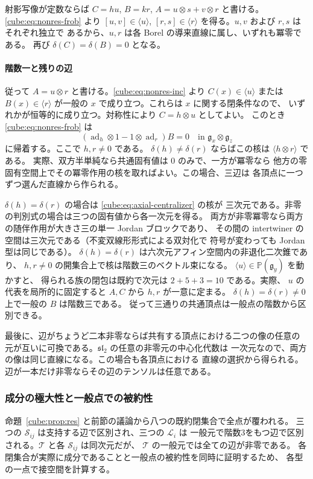 射影写像が定数ならば $C=hu$, $B=kr$, $A=u\otimes s+v\otimes r$ と書ける。
\eqref{cube:eq:nonres-frob} より $[u,v]\in\langle u\rangle$,
$[r,s]\in\langle r\rangle$ を得る。$u,v$ および $r,s$ はそれぞれ独立で
あるから、$u,r$ は各 Borel の導来直線に属し、いずれも冪零である。
再び $\delta(C)=\delta(B)=0$ となる。

\paragraph{階数一と残りの辺}
従って $A=u\otimes r$ と書ける。\eqref{cube:eq:nonres-inc} より
$C(x)\in\langle u\rangle$ または $B(x)\in\langle r\rangle$
が一般の $x$ で成り立つ。これらは $x$ に関する閉条件なので、
いずれかが恒等的に成り立つ。対称性により $C=h\otimes u$ としてよい。
このとき \eqref{cube:eq:nonres-frob} は
\begin{equation}\label{cube:eq:axial-centralizer}
 (\operatorname{ad}_h\otimes1-1\otimes\operatorname{ad}_r)B=0
 \quad\text{in }\mathfrak g_x\otimes\mathfrak g_z
\end{equation}
に帰着する。ここで $h,r\ne0$ である。
$\delta(h)\ne\delta(r)$ ならばこの核は $\langle h\otimes r\rangle$ である。
実際、双方半単純なら共通固有値は $0$ のみで、一方が冪零なら
他方の零固有空間上でその冪零作用の核を取ればよい。この場合、三辺は
各頂点に一つずつ選んだ直線から作られる。

$\delta(h)=\delta(r)$ の場合は \eqref{cube:eq:axial-centralizer} の核が
三次元である。非零の判別式の場合は三つの固有値から各一次元を得る。
両方が非零冪零なら両方の随伴作用が大きさ三の単一 Jordan ブロックであり、
その間の intertwiner の空間は三次元である（不変双線形形式による双対化で
符号が変わっても Jordan 型は同じである）。
$\delta(h)=\delta(r)$ は六次元アフィン空間内の非退化二次錐であり、
$h,r\ne0$ の開集合上で核は階数三のベクトル束になる。
$\langle u\rangle\in\mathbb P(\mathfrak g_y)$ を動かすと、
得られる族の閉包は既約で次元は $2+5+3=10$ である。実際、
$u$ の代表を局所的に固定すると $A,C$ から $h,r$ が一意に定まる。
$\delta(h)=\delta(r)\ne0$ 上で一般の $B$ は階数三である。
従って三通りの共通頂点は一般点の階数から区別できる。

最後に、辺がちょうど二本非零ならば共有する頂点における二つの像の任意の
元が互いに可換である。$\mathfrak{sl}_2$ の任意の非零元の中心化代数は
一次元なので、両方の像は同じ直線になる。この場合も各頂点における
直線の選択から得られる。辺が一本だけ非零ならその辺のテンソルは任意である。
\subsubsection{成分の極大性と一般点での被約性}
命題~\ref{cube:prop:res} と前節の議論から八つの既約閉集合で全点が覆われる。
三つの $\mathcal S_{ij}$ は支持する辺で区別され、三つの $\mathcal L_i$ は
一般元で階数3をもつ辺で区別される。$\mathcal T$ と各 $\mathcal S_{ij}$ は同次元だが、
$\mathcal T$ の一般元では全ての辺が非零である。
各閉集合が実際に成分であることと一般点の被約性を同時に証明するため、
各型の一点で接空間を計算する。

